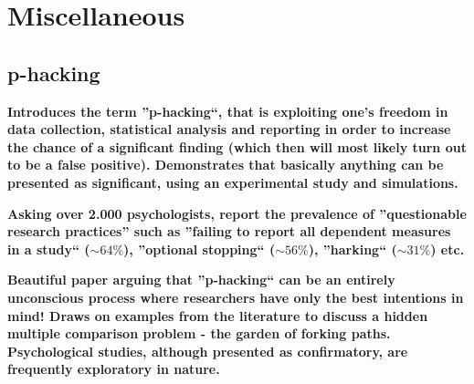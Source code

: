 \documentclass[12pt]{scrartcl}
\begin{document}
\section{Miscellaneous}

\subsection{p-hacking}
\begin{description}
  \item {}
  
  \textbf{Introduces the term ''p-hacking``, that is exploiting one's freedom in data collection, statistical analysis and reporting in order to increase the chance of a significant finding (which then will most likely turn out to be a false positive). Demonstrates that basically anything can be presented as significant, using an experimental study and simulations.}
  
  \item {}
  
  \textbf{Asking over 2.000 psychologists, report the prevalence of ''questionable research practices'' such as ''failing to report all dependent measures in a study`` ($\sim 64\%$), ''optional stopping`` ($\sim 56\%$), ''harking`` ($\sim 31\%$) etc.}
  
  \item {}
  
  \textbf{Beautiful paper arguing that ''p-hacking`` can be an entirely unconscious process where researchers have only the best intentions in mind! Draws on examples from the literature to discuss a hidden multiple comparison problem - the garden of forking paths. Psychological studies, although presented as confirmatory, are frequently exploratory in nature.}
\end{description}
\end{document}
